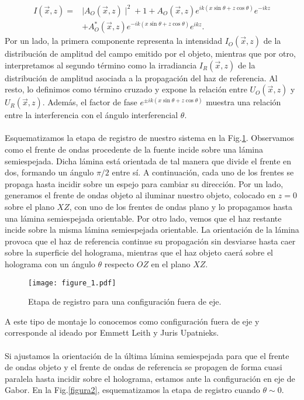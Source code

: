 \documentclass[12pt]{article}
\begin{document}
\begin{align}
     I (\Vec{x}, z) =&  \mid A_O (\Vec{x}, z) \mid ^{2} + 1 + A_O (\Vec{x}, z) e^{i k (x \sin{\theta}+ z\cos{\theta})} e^{- i k z} \nonumber \\
     &+ A_O^{*} (\Vec{x}, z) e^{- i k (x \sin{\theta} + z \cos{\theta})} e^{i k z}.
    \label{Ec.7}
\end{align}
Por un lado, la primera componente  representa la  intensidad   $I_O(\Vec{x}, z)$ de la distribución de amplitud del campo emitido por el objeto, mientras que por otro, interpretamos al segundo término como la irradiancia  $I_R(\Vec{x}, z)$ de la distribución de amplitud asociada a la propagación del haz de referencia. Al resto, lo definimos como  término cruzado y expone la relación entre $U_O (\vec{x}, z)$ y $U_R (\vec{x}, z)$. Además, el factor de fase  $e^{\pm i k (x \sin{\theta} + z \cos{\theta})}$  muestra una  relación entre la interferencia con  el ángulo interferencial $\theta$.\\ \\
Esquematizamos la etapa de registro de nuestro sistema en la Fig.\ref{figura1}. Observamos como el frente de ondas procedente de la fuente incide sobre una lámina semiespejada. Dicha lámina está orientada de tal manera que  divide el frente  en dos, formando un ángulo $\pi/2$ entre sí. A continuación,  cada uno de los frentes se propaga hasta incidir sobre un espejo para cambiar su dirección. Por un lado, generamos el frente de ondas objeto al iluminar nuestro objeto, colocado en $z=0$  sobre el plano $XZ$,  con uno de los frentes de ondas plano y lo propagamos hasta una lámina semiespejada orientable. Por otro lado, vemos que el haz restante incide sobre la misma lámina semiespejada orientable. La orientación de la lámina provoca que el haz de referencia continue su propagación sin desviarse hasta caer sobre la superficie del holograma, mientras que el haz objeto caerá sobre el holograma con un ángulo $\theta$ respecto $OZ$ en el plano $XZ$.
\begin{figure}[bt!]
    \centering
    \texttt{[image: figure\_1.pdf]}\\
    \caption{Etapa de registro  para una configuración fuera de eje.}
    \label{figura1}
\end{figure}
A este tipo de montaje lo conocemos como configuración fuera de eje y corresponde al ideado por   Emmett Leith y Juris Upatnieks. \\ \\
Si ajustamos la orientación de la última lámina semiespejada para que el frente de ondas objeto y el frente de ondas de referencia se propagen de forma cuasi paralela hasta incidir sobre el holograma, estamos ante la configuración en eje de Gabor. En la Fig.\ref{figura2}, esquematizamos la etapa de registro cuando $\theta \sim 0$.
\end{document}
